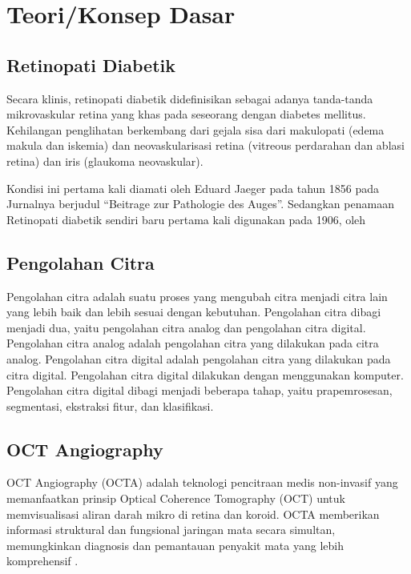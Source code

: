 \section{Teori/Konsep Dasar}
\label{sec:22}

\subsection{Retinopati Diabetik}
Secara klinis, retinopati diabetik didefinisikan sebagai adanya tanda-tanda mikrovaskular retina yang khas pada seseorang dengan diabetes mellitus. Kehilangan penglihatan berkembang dari gejala sisa dari makulopati (edema makula dan iskemia) dan neovaskularisasi retina (vitreous perdarahan dan ablasi retina) dan iris (glaukoma neovaskular)\parencite{Cheung2010}. 

Kondisi ini pertama kali diamati oleh Eduard Jaeger pada tahun 1856 pada Jurnalnya berjudul “Beitrage zur Pathologie des Auges”\parencite{jaeger1855}. Sedangkan penamaan Retinopati diabetik sendiri baru pertama kali digunakan pada 1906, oleh 

\subsection{Pengolahan Citra}
\label{sec:221}

Pengolahan citra adalah suatu proses yang mengubah citra menjadi citra lain yang lebih baik dan lebih sesuai dengan kebutuhan. Pengolahan citra dibagi menjadi dua, yaitu pengolahan citra analog dan pengolahan citra digital. Pengolahan citra analog adalah pengolahan citra yang dilakukan pada citra analog. Pengolahan citra digital adalah pengolahan citra yang dilakukan pada citra digital. Pengolahan citra digital dilakukan dengan menggunakan komputer. Pengolahan citra digital dibagi menjadi beberapa tahap, yaitu prapemrosesan, segmentasi, ekstraksi fitur, dan klasifikasi.

\subsection{OCT Angiography}
\label{sec:222}

OCT Angiography (OCTA) adalah teknologi pencitraan medis non-invasif yang memanfaatkan prinsip Optical Coherence Tomography (OCT) untuk memvisualisasi aliran darah mikro di retina dan koroid. OCTA memberikan informasi struktural dan fungsional jaringan mata secara simultan, memungkinkan diagnosis dan pemantauan penyakit mata yang lebih komprehensif \parencite{Kashani2017-hn}.

